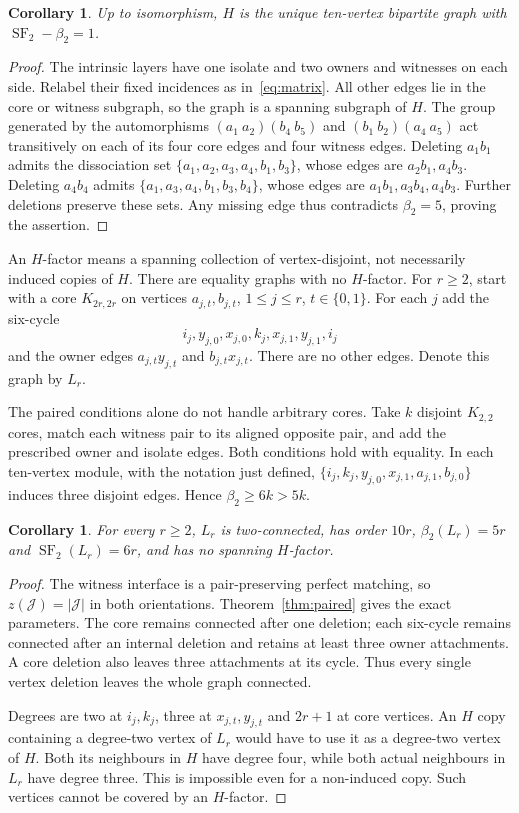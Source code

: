\documentclass[11pt]{article}
\newtheorem{corollary}[theorem]{Corollary}
\newcommand{\SF}{\operatorname{SF}_2}
\newcommand{\diss}{\beta_2}
\begin{document}
\begin{corollary}
Up to isomorphism, $H$ is the unique ten-vertex bipartite graph with
$\SF-\diss=1$.
\end{corollary}
\begin{proof}
The intrinsic layers have one isolate and two owners and witnesses on
each side. Relabel their fixed incidences as in~\eqref{eq:matrix}.
All other edges lie in the core or witness subgraph, so the graph is a
spanning subgraph of $H$. The group generated by the automorphisms
$(a_1\ a_2)(b_4\ b_5)$ and $(b_1\ b_2)(a_4\ a_5)$ act transitively
on each of its four core edges and four witness edges.
Deleting $a_1b_1$ admits the dissociation set
$\{a_1,a_2,a_3,a_4,b_1,b_3\}$, whose edges are $a_2b_1,a_4b_3$.
Deleting $a_4b_4$ admits $\{a_1,a_3,a_4,b_1,b_3,b_4\}$, whose edges
are $a_1b_1,a_3b_4,a_4b_3$. Further deletions preserve these sets.
Any missing edge thus contradicts $\diss=5$, proving the assertion.
\end{proof}

An $H$-factor means a spanning collection of vertex-disjoint, not
necessarily induced copies of $H$. There are equality graphs with no
$H$-factor.
For $r\ge2$, start with a core $K_{2r,2r}$ on vertices
$a_{j,t},b_{j,t}$, $1\le j\le r$, $t\in\{0,1\}$.
For each $j$ add the six-cycle
\[
 i_j,y_{j,0},x_{j,0},k_j,x_{j,1},y_{j,1},i_j
\]
and the owner edges $a_{j,t}y_{j,t}$ and $b_{j,t}x_{j,t}$. There are
no other edges. Denote this graph by $L_r$.

The paired conditions alone do not handle arbitrary cores. Take $k$
disjoint $K_{2,2}$ cores, match each witness pair to its aligned opposite
pair, and add the prescribed owner and isolate edges. Both conditions
hold with equality. In each ten-vertex module, with the notation just defined, $\{i_j,k_j,y_{j,0},x_{j,1},a_{j,1},b_{j,0}\}$ induces three
disjoint edges. Hence $\diss\ge6k>5k$.

\begin{corollary}
For every $r\ge2$, $L_r$ is two-connected, has order $10r$,
$\diss(L_r)=5r$ and $\SF(L_r)=6r$, and has no spanning $H$-factor.
\end{corollary}
\begin{proof}
The witness interface is a pair-preserving perfect matching, so
$z(\mathcal J)=|\mathcal J|$ in both orientations.
Theorem~\ref{thm:paired} gives the exact parameters. The core remains
connected after one deletion; each six-cycle remains connected after
an internal deletion and retains at least three owner attachments.
A core deletion also leaves three attachments at its cycle. Thus every
single vertex deletion leaves the whole graph connected.

Degrees are two at $i_j,k_j$, three at $x_{j,t},y_{j,t}$ and $2r+1$
at core vertices. An $H$ copy containing a degree-two vertex of $L_r$
would have to use it as a degree-two vertex of $H$. Both its neighbours
in $H$ have degree four, while both actual neighbours in $L_r$ have
degree three. This is impossible even for a non-induced copy. Such
vertices cannot be covered by an $H$-factor.
\end{proof}
\end{document}
